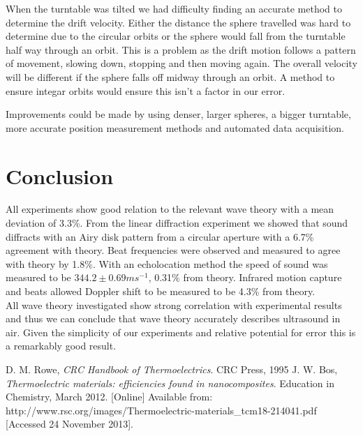 \documentclass[a4paper,10pt,journal]{IEEEtran}
\begin{document}
When the turntable was tilted we had difficulty finding an accurate method to determine the drift velocity. Either the distance the sphere travelled was hard to determine due to the circular orbits or the sphere would fall from the turntable half way through an orbit. This is a problem as the drift motion follows a pattern of movement, slowing down, stopping and then moving again. The overall velocity will be different if the sphere falls off midway through an orbit. A method to ensure integar orbits would ensure this isn't a factor in our error.

Improvements could be made by using denser, larger spheres, a bigger turntable, more accurate position measurement methods and automated data acquisition.

\section{Conclusion}

All experiments show good relation to the relevant wave theory with a mean deviation of 3.3\%. From the linear diffraction experiment we showed that sound diffracts with an Airy disk pattern from a circular aperture with a 6.7\% agreement with theory. Beat frequencies were observed and measured to agree with theory by 1.8\%. With an echolocation method the speed of sound was measured to be $344.2 \pm 0.69 ms^{-1}$, 0.31\% from theory. Infrared motion capture and beats allowed Doppler shift to be measured to be 4.3\% from theory.\\
All wave theory investigated show strong correlation with experimental results and thus we can conclude that wave theory accurately describes ultrasound in air. Given the simplicity of our experiments and relative potential for error this is a remarkably good result.


\begin{thebibliography}{9}
D. M. Rowe, \emph{CRC Handbook of Thermoelectrics}. CRC Press, 1995
J. W. Bos, \emph{Thermoelectric materials: efficiencies found in
nanocomposites}. Education in Chemistry, March 2012. [Online] Available
from:
http://www.rsc.org/images/Thermoelectric-materials_tcm18-214041.pdf
[Accessed 24 November 2013].

\end{thebibliography}
\end{document}
